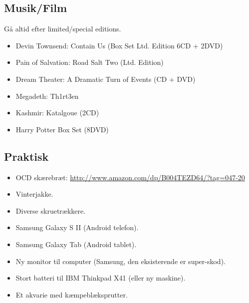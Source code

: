 \documentclass[a4paper, danish, 10pt, final]{article}
\begin{document}
\subsection*{Musik/Film}

Gå altid efter limited/special editions.
\begin{itemize}
    \item Devin Townsend: Contain Us (Box Set Ltd. Edition 6CD + 2DVD)
    \item Pain of Salvation: Road Salt Two (Ltd. Edition)
    \item Dream Theater: A Dramatic Turn of Events (CD + DVD)
    \item Megadeth: Th1rt3en
    \item Kashmir: Katalgoue (2CD)
    \item Harry Potter Box Set (8DVD)
\end{itemize}

\subsection*{Praktisk}
\begin{itemize}
    \item OCD skærebræt: \url{http://www.amazon.com/dp/B004TEZD64/?tag=047-20}
    \item Vinterjakke.
    \item Diverse skruetrækkere.
    \item Samsung Galaxy S II (Android telefon).
    \item Samsung Galaxy Tab (Android tablet).
    \item Ny monitor til computer (Samsung, den eksisterende er super-skod).
    \item Stort batteri til IBM Thinkpad X41 (eller ny maskine).
    \item Et akvarie med kæmpeblæksprutter.
\end{itemize}




\end{document}
